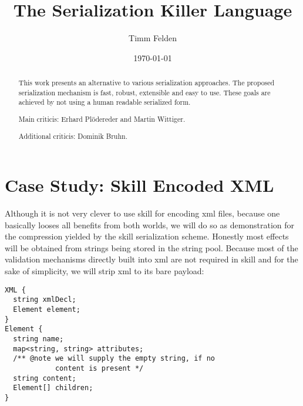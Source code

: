 \documentclass[a4paper,10pt]{article}
\title{The Serialization Killer Language}
\author{Timm Felden}
\date{\today}
\begin{document}
\maketitle

\begin{abstract}
 This work presents an alternative to various serialization approaches. The proposed serialization mechanism is fast, robust, extensible and easy to use. These goals are achieved by not using a human readable serialized form. 
\end{abstract}


\renewcommand{\abstractname}{Acknowledgements}
\begin{abstract}
Main criticis: Erhard Plödereder and Martin Wittiger.

Additional criticis: Dominik Bruhn.
\end{abstract}











\section{Case Study: Skill Encoded XML}
Although it is not very clever to use skill for encoding xml files, because one basically looses all benefits from both worlds, we will do so as demonstration for the compression yielded by the skill serialization scheme. Honestly most effects will be obtained from strings being stored in the string pool. Because most of the validation mechanisms directly built into xml are not required in skill and for the sake of simplicity, we will strip xml to its bare payload:
\begin{lstlisting}[label=sex,caption=Skill Encoded XML]
XML {
  string xmlDecl;
  Element element;
}
Element {
  string name;
  map<string, string> attributes;
  /** @note we will supply the empty string, if no
            content is present */
  string content;
  Element[] children;
}
\end{lstlisting}
\end{document}
